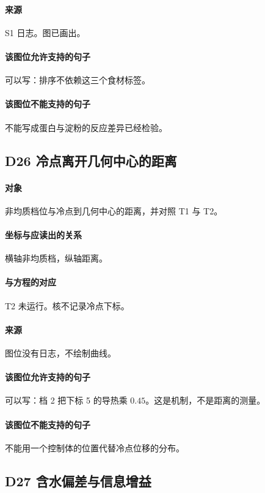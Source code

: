 \paragraph{来源}
S1 日志。图已画出。

\paragraph{该图位允许支持的句子}
可以写：排序不依赖这三个食材标签。

\paragraph{该图位不能支持的句子}
不能写成蛋白与淀粉的反应差异已经检验。

\subsection{D26 冷点离开几何中心的距离}
\paragraph{对象}
非均质档位与冷点到几何中心的距离，并对照 T1 与 T2。

\paragraph{坐标与应读出的关系}
横轴非均质档，纵轴距离。

\paragraph{与方程的对应}
T2 未运行。核不记录冷点下标。

\paragraph{来源}
图位没有日志，不绘制曲线。

\paragraph{该图位允许支持的句子}
可以写：档 2 把下标 5 的导热乘 $0.45$。这是机制，不是距离的测量。

\paragraph{该图位不能支持的句子}
不能用一个控制体的位置代替冷点位移的分布。

\subsection{D27 含水偏差与信息增益}

